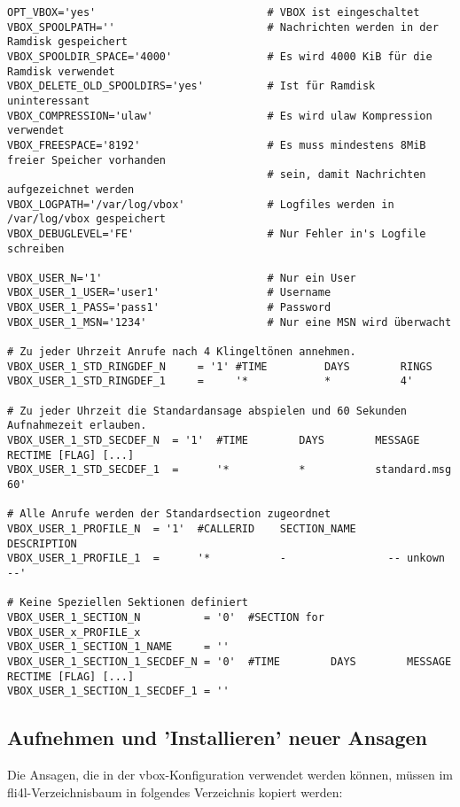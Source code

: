 \begin{verbatim}
OPT_VBOX='yes'                           # VBOX ist eingeschaltet
VBOX_SPOOLPATH=''                        # Nachrichten werden in der Ramdisk gespeichert
VBOX_SPOOLDIR_SPACE='4000'               # Es wird 4000 KiB für die Ramdisk verwendet
VBOX_DELETE_OLD_SPOOLDIRS='yes'          # Ist für Ramdisk uninteressant
VBOX_COMPRESSION='ulaw'                  # Es wird ulaw Kompression verwendet
VBOX_FREESPACE='8192'                    # Es muss mindestens 8MiB freier Speicher vorhanden
                                         # sein, damit Nachrichten aufgezeichnet werden
VBOX_LOGPATH='/var/log/vbox'             # Logfiles werden in /var/log/vbox gespeichert
VBOX_DEBUGLEVEL='FE'                     # Nur Fehler in's Logfile schreiben

VBOX_USER_N='1'                          # Nur ein User
VBOX_USER_1_USER='user1'                 # Username
VBOX_USER_1_PASS='pass1'                 # Password
VBOX_USER_1_MSN='1234'                   # Nur eine MSN wird überwacht

# Zu jeder Uhrzeit Anrufe nach 4 Klingeltönen annehmen.
VBOX_USER_1_STD_RINGDEF_N     = '1' #TIME         DAYS        RINGS
VBOX_USER_1_STD_RINGDEF_1     =     '*            *           4'

# Zu jeder Uhrzeit die Standardansage abspielen und 60 Sekunden Aufnahmezeit erlauben.
VBOX_USER_1_STD_SECDEF_N  = '1'  #TIME        DAYS        MESSAGE             RECTIME [FLAG] [...]
VBOX_USER_1_STD_SECDEF_1  =      '*           *           standard.msg        60'

# Alle Anrufe werden der Standardsection zugeordnet
VBOX_USER_1_PROFILE_N  = '1'  #CALLERID    SECTION_NAME     DESCRIPTION
VBOX_USER_1_PROFILE_1  =      '*           -                -- unkown --'

# Keine Speziellen Sektionen definiert
VBOX_USER_1_SECTION_N          = '0'  #SECTION for VBOX_USER_x_PROFILE_x
VBOX_USER_1_SECTION_1_NAME     = ''
VBOX_USER_1_SECTION_1_SECDEF_N = '0'  #TIME        DAYS        MESSAGE             RECTIME [FLAG] [...]
VBOX_USER_1_SECTION_1_SECDEF_1 = ''

\end{verbatim}    

\subsection{Aufnehmen und 'Installieren' neuer Ansagen}

Die Ansagen, die in der vbox-Konfiguration verwendet werden können, müssen im fli4l-Verzeichnisbaum 
in folgendes Verzeichnis kopiert werden:

